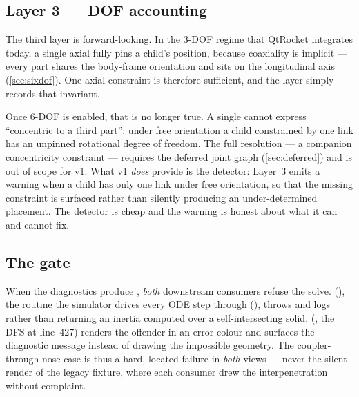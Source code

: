 \subsection{Layer 3 --- DOF accounting}

The third layer is forward-looking. In the 3-DOF regime that QtRocket integrates today, a single
axial  fully pins a child's position, because coaxiality is implicit --- every
part shares the body-frame orientation and sits on the longitudinal axis (\cref{sec:sixdof}).
One axial constraint is therefore sufficient, and the layer simply records that invariant.

Once 6-DOF is enabled, that is no longer true. A single  cannot express
``concentric to a third part'': under free orientation a child constrained by one link has an
unpinned rotational degree of freedom. The full resolution --- a companion concentricity
constraint --- requires the deferred joint graph (\cref{sec:deferred}) and is out of scope for
v1. What v1 \emph{does} provide is the detector: Layer~3 emits a warning when a child has only
one link under free orientation, so that the missing constraint is surfaced rather than silently
producing an under-determined placement. The detector is cheap and the warning is honest about
what it can and cannot fix.

\subsection{The gate}

\begin{hardfail}[\texttt{SolveResult.ok == false} stops both consumers]
When the diagnostics produce , \emph{both} downstream consumers
refuse the solve.  (), the routine the
simulator drives every ODE step through 
(), throws and logs rather than returning an inertia computed
over a self-intersecting solid.  (, the
DFS at line~427) renders the offender in an error colour and surfaces the diagnostic message
instead of drawing the impossible geometry. The coupler-through-nose case is thus a hard,
located failure in \emph{both} views --- never the silent render of the legacy
 fixture, where each consumer drew the
interpenetration without complaint.
\end{hardfail}

